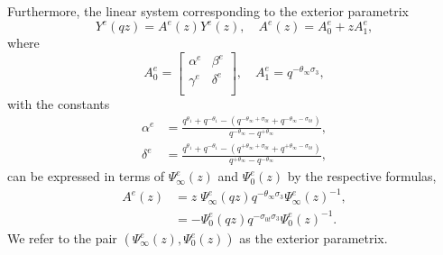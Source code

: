 \documentclass[a4paper,reqno,11pt]{amsart}
\numberwithin{equation}{section}
\numberwithin{figure}{section}
\theoremstyle{plain}
\theoremstyle{remark}
\numberwithin{rhp}{section}
\begin{document}
Furthermore, the linear system corresponding to the exterior parametrix
\begin{equation}\label{ext-hyp}
    Y^e(qz)=A^e(z)Y^e(z),\quad A^e(z)=A_0^e+zA_1^e,
\end{equation}
where
\begin{equation}\label{eq:A0e}
    A_0^e=\begin{bmatrix}
    \alpha^e & \beta^e\\
    \gamma^e& \delta^e\\
    \end{bmatrix},\quad
      A_1^e=q^{-\theta_\infty \sigma_3},
\end{equation}
with the constants
\begin{align*}
     \alpha^e&=\frac{q^{\theta_1}+q^{-\theta_1}-(q^{-\theta_\infty+\sigma_{0t}}+q^{-\theta_\infty-\sigma_{0t}})}{q^{-\theta_\infty}-q^{+\theta_\infty}},\\
     \delta^e&=\frac{q^{\theta_1}+q^{-\theta_1}-(q^{+\theta_\infty+\sigma_{0t}}+q^{+\theta_\infty-\sigma_{0t}})}{q^{+\theta_\infty}-q^{-\theta_\infty}},
\end{align*}
can be expressed in terms of $\Psi_\infty^e(z)$ and $\Psi_0^e(z)$ by the respective formulas,
\begin{align*}
    A^e(z)&=z\;\Psi_\infty^e(qz)q^{-\theta_\infty \sigma_3}\Psi_\infty^e(z)^{-1},\\
    &=-\Psi_0^e(qz)q^{-\sigma_{0t}\sigma_3}\Psi_0^e(z)^{-1}.
\end{align*}
We refer to the pair $(\Psi_\infty^e(z),\Psi_0^e(z))$ as the exterior parametrix.
\end{document}
